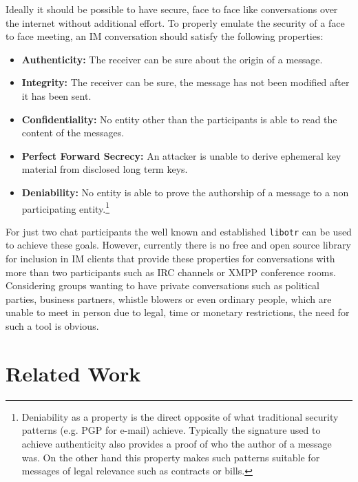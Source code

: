Ideally it should be possible to have secure, face to face
like conversations over the internet without additional effort. To properly
emulate the security of a face to face meeting, an IM conversation should
satisfy the following properties:

\begin{itemize}

	\item{\textbf{Authenticity:} The receiver can be sure about the origin of a
		message.}

	\item{\textbf{Integrity:} The receiver can be sure, the message has not been
		modified after it has been sent.}

	\item{\textbf{Confidentiality:} No entity other than the participants is
		able to read the content of the messages.}

	\item{\textbf{Perfect Forward Secrecy:} An attacker is unable to derive
		ephemeral key material from disclosed long term keys.}

	\item{\textbf{Deniability:} No entity is able to prove the authorship of a
			message to a non participating entity.\footnote{Deniability as a
				property is the direct opposite of what traditional security
				patterns (e.g. PGP for e-mail) achieve. Typically the signature
		used to achieve authenticity also provides a proof of who the author of
a message was. On the other hand this property makes such patterns suitable for
messages of legal relevance such as contracts or bills.}}

\end{itemize}

For just two chat participants the well known and established \texttt{libotr} can be used
to achieve these goals. However, currently there is no free and open source
library for inclusion in IM clients that provide these properties for
conversations with more than two participants such as IRC channels or XMPP
conference rooms. Considering groups wanting to have private conversations such
as political parties, business partners, whistle blowers or even ordinary people, which are unable to
meet in person due to legal, time or monetary restrictions, the need for such a
tool is obvious.

\section{Related Work}

